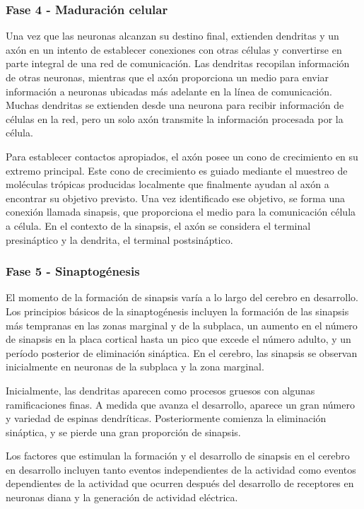 \documentclass[11pt,letterpaper]{report}
\begin{document}
\subsubsection{Fase 4 - Maduración celular}
Una vez que las neuronas alcanzan su destino final, extienden dendritas y un
axón en un intento de establecer conexiones con otras células y convertirse en
parte integral de una red de comunicación. Las dendritas recopilan información
de otras neuronas, mientras que el axón proporciona un medio para enviar
información a neuronas ubicadas más adelante en la línea de comunicación.
Muchas dendritas se extienden desde una neurona para recibir información de
células en la red, pero un solo axón transmite la información procesada por la
célula. \cite{Gibb2018}

Para establecer contactos apropiados, el axón posee un cono de crecimiento en
su extremo principal. Este cono de crecimiento es guiado mediante el muestreo
de moléculas trópicas producidas localmente que finalmente ayudan al axón a
encontrar su objetivo previsto. Una vez identificado ese objetivo, se forma una
conexión llamada sinapsis, que proporciona el medio para la comunicación célula
a célula. En el contexto de la sinapsis, el axón se considera el terminal
presináptico y la dendrita, el terminal postsináptico. \cite{Gibb2018}

\subsubsection{Fase 5 - Sinaptogénesis}
El momento de la formación de sinapsis varía a lo largo del cerebro en
desarrollo. Los principios básicos de la sinaptogénesis incluyen la formación
de las sinapsis más tempranas en las zonas marginal y de la subplaca, un
aumento en el número de sinapsis en la placa cortical hasta un pico que excede
el número adulto, y un período posterior de eliminación sináptica. En el
cerebro, las sinapsis se observan inicialmente en neuronas de la subplaca y la
zona marginal. \cite{Polin124}

Inicialmente, las dendritas aparecen como procesos gruesos con algunas 
ramificaciones finas. A medida que avanza el desarrollo, aparece un gran número
y variedad de espinas dendríticas. Posteriormente comienza la eliminación
sináptica, y se pierde una gran proporción de sinapsis. \cite{Polin124}

Los factores que estimulan la formación y el desarrollo de sinapsis en el
cerebro en desarrollo incluyen tanto eventos independientes de la actividad
como eventos dependientes de la actividad que ocurren después del desarrollo de
receptores en neuronas diana y la generación de actividad eléctrica.
\cite{Polin124}
\end{document}
